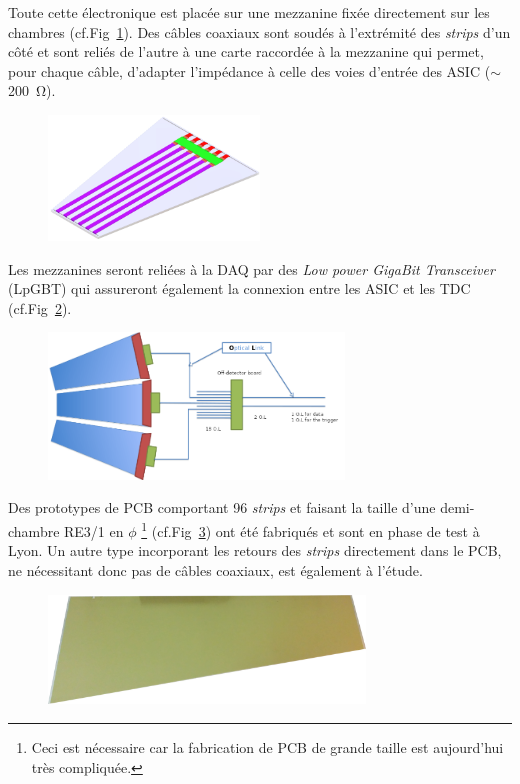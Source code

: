 Toute cette électronique est placée sur une mezzanine fixée directement sur les chambres (cf.Fig~\ref{chamber}). Des câbles coaxiaux sont soudés à l'extrémité des \textit{strips} d'un côté et sont reliés de l'autre à une carte raccordée à la mezzanine qui permet, pour chaque câble, d'adapter l'impédance à celle des voies d'entrée des ASIC ($\sim$\SI{200}{\ohm}).  

\begin{figure}[ht!]
	\centering
	\includegraphics[width=0.50\textwidth]{CON/chambre.png}
	\label{chamber}
\end{figure}

Les mezzanines seront reliées à la DAQ par des \textit{Low power GigaBit Transceiver} (LpGBT) qui assureront également la connexion entre les ASIC et les TDC (cf.Fig~\ref{chambres}). 

\begin{figure}[ht!]
	\centering
	\includegraphics[width=0.70\textwidth]{CON/chambres.png}
	\label{chambres}
\end{figure}

Des prototypes de PCB comportant \num{96} \textit{strips} et faisant la taille d'une demi-chambre RE3/1 en $\phi$ \footnote{Ceci est nécessaire car la fabrication de PCB de grande taille est aujourd'hui très compliquée.} (cf.Fig~\ref{proto}) ont été fabriqués et sont en phase de test à Lyon. Un autre type incorporant les retours des \textit{strips} directement dans le PCB, ne nécessitant donc pas de câbles coaxiaux, est également à l'étude.

\begin{figure}[ht!]
	\centering
	\includegraphics[width=0.75\textwidth]{CON/proto.png}
	\label{proto}
\end{figure}
